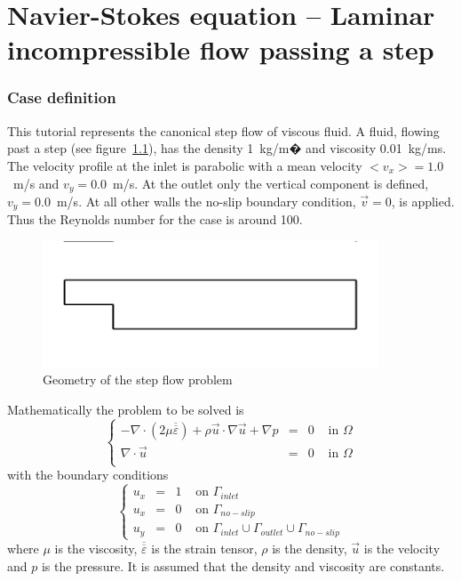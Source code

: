 \chapter{Navier-Stokes equation -- Laminar incompressible flow passing a step}
\label{tut:stepflowgui}



\subsection*{Case definition}

This tutorial represents the canonical step flow of viscous fluid. 
A fluid, flowing past a step (see figure~\ref{fg:struct2}), has the density
1~kg/m$�$ and viscosity 0.01~kg/ms. The velocity profile at the inlet is
parabolic with a mean velocity $<v_x>=1.0$~m/s and $v_y=0.0$~m/s. At the outlet only 
the vertical component is defined, $v_y=0.0$~m/s. At all other
walls the no-slip boundary condition, $\vec{v}=0$, is applied. 
Thus the Reynolds number for the case is around 100. 

\begin{figure}[h]
\centering
\includegraphics[width=100mm,viewport=0 30 800 270,clip]{geom}
\caption{Geometry of the step flow problem}\label{fg:struct2}
\end{figure}
%
Mathematically the problem to be solved is
\begin{equation}
\left \{
\begin{array}{rccl}
- \nabla \cdot (2 \mu \overline{\overline{\varepsilon}}) + \rho 
\vec{u} \cdot \nabla \vec{u} + \nabla p & = & 0 & \mbox{ in } \Omega \\
\nabla \cdot \vec{u} & = & 0 & \mbox{ in } \Omega \\
\end{array}
\right .
\end{equation}
%
with the boundary conditions
\begin{equation}
\left \{
\begin{array}{rccl}
u_x & = & 1 & \mbox{ on } \Gamma_{inlet} \\
u_x & = & 0 & \mbox{ on } \Gamma_{no-slip} \\
u_y & = & 0 & \mbox{ on } \Gamma_{inlet} \cup \Gamma_{outlet} \cup \Gamma_{no-slip} 
\end{array}
\right .
\end{equation}
where $\mu$ is the viscosity, $\overline{\overline{\varepsilon}}$ is 
the strain tensor,  $\rho$ is the density, $\vec{u}$ is the velocity and
$p$ is the pressure. It is assumed that the density and viscosity are 
constants. 



